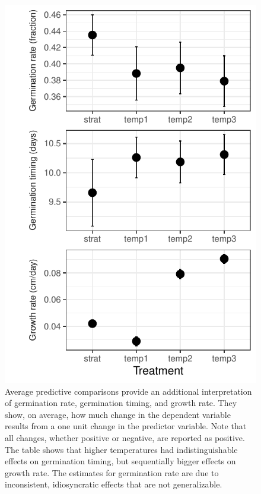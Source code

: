 \documentclass[12pt]{article}\usepackage[]{graphicx}\usepackage[]{color}
\begin{document}
\begin{figure}
	\begin{center}
	\includegraphics[scale=1]{apc_fig.pdf}
	\caption{Average predictive comparisons provide an additional interpretation of germination rate, germination timing, and growth rate.  They show, on average, how much change in the dependent variable results from a one unit change in the predictor variable. Note that all changes, whether positive or negative, are reported as positive. The table shows that higher temperatures had indistinguishable effects on germination timing, but sequentially bigger effects on growth rate. The estimates for germination rate are due to inconsistent, idiosyncratic effects that are not generalizable.}
\label{fig:apc}
\end{center}
\end{figure}
\end{document}
